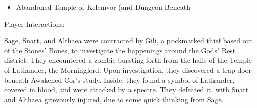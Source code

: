 \documentclass[11pt]{article}
\theoremstyle{definition}
\theoremstyle{remark}
\begin{document}
\begin{description}
\begin{itemize}
\item{Abandoned Temple of Kelemvor (and Dungeon Beneath}

\end{itemize}

\item{Player Interactions: }

Sage, Snart, and Althaea were contracted by Gili, a pockmarked thief based out of the Stones' Bones, to investigate the happenings around the Gods' Rest district. They encountered a zombie bursting forth from the halls of the Temple of Lathander, the Morninglord. Upon investigation, they discovered a trap door beneath Awakened Cor's study. Inside, they found a symbol of Lathander, covered in blood, and were attacked by a spectre. They defeated it, with Snart and Althaea grievously injured, due to some quick thinking from Sage. 

\end{description}
\end{document}
